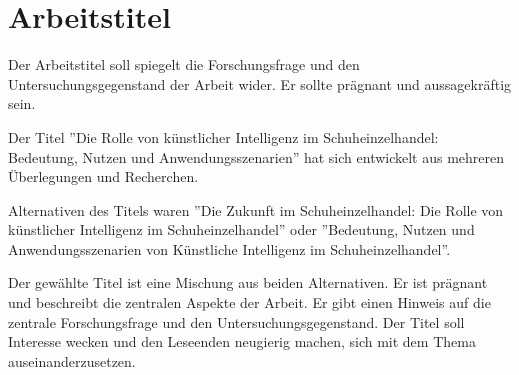

\section{Arbeitstitel}

Der Arbeitstitel soll spiegelt die Forschungsfrage und den Untersuchungsgegenstand der Arbeit wider. Er sollte prägnant und aussagekräftig sein. 

Der Titel ''Die Rolle von künstlicher Intelligenz im Schuheinzelhandel: Bedeutung, Nutzen und Anwendungsszenarien'' hat sich entwickelt aus mehreren Überlegungen und Recherchen. 

Alternativen des Titels waren ''Die Zukunft im Schuheinzelhandel: Die Rolle von künstlicher Intelligenz im Schuheinzelhandel'' oder ''Bedeutung, Nutzen und Anwendungsszenarien von Künstliche Intelligenz im Schuheinzelhandel''. 

Der gewählte Titel ist eine Mischung aus beiden Alternativen. Er ist prägnant und beschreibt die zentralen Aspekte der Arbeit. Er gibt einen Hinweis auf die zentrale Forschungsfrage und den Untersuchungsgegenstand. Der Titel soll Interesse wecken und den Leseenden neugierig machen, sich mit dem Thema auseinanderzusetzen. 


\clearpage